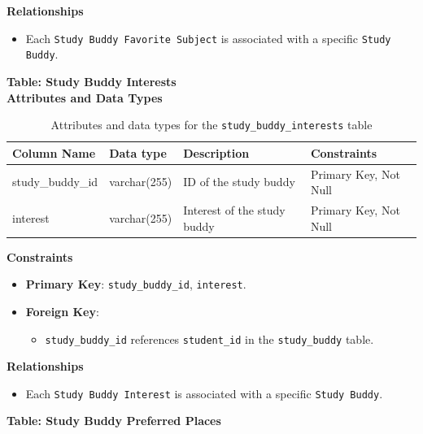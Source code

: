 \documentclass[12pt]{article}
\begin{document}
    \noindent 
    \textbf{Relationships} 
    \begin{itemize} 
        \item Each \texttt{Study Buddy Favorite Subject} is associated with a specific \texttt{Study Buddy}.
    \end{itemize}


    \textbf{Table: Study Buddy Interests} \\

    \textbf{Attributes and Data Types}
    \begin{table}[H] 
        \centering 
        \renewcommand{\arraystretch}{1.5} 
        \begin{tabular}{|l|l|p{4.5cm}|l|} 
        \hline 
        \rowcolor[HTML]{96FFFB} 
        \textbf{Column Name} & \textbf{Data type} & \textbf{Description} & \textbf{Constraints} \\ \hline 
        study\_buddy\_id & varchar(255) & ID of the study buddy & Primary Key, Not Null \\ \hline 
        interest & varchar(255) & Interest of the study buddy & Primary Key, Not Null \\ \hline 
        \end{tabular} 
        \caption{Attributes and data types for the \texttt{study\_buddy\_interests} table} 
    \end{table}

    \noindent 
    \textbf{Constraints} 
    \begin{itemize} 
        \item \textbf{Primary Key}: \texttt{study\_buddy\_id}, \texttt{interest}. 
        \item \textbf{Foreign Key}: \begin{itemize} \item \texttt{study\_buddy\_id} references \texttt{student\_id} in the \texttt{study\_buddy} table. 
        \end{itemize} 
    \end{itemize}

    \noindent 
    \textbf{Relationships} 
    \begin{itemize} 
        \item Each \texttt{Study Buddy Interest} is associated with a specific \texttt{Study Buddy}. 
    \end{itemize}

    \textbf{Table: Study Buddy Preferred Places} \\
\end{document}
